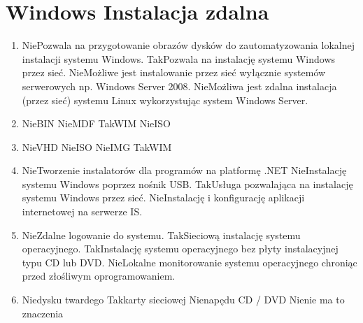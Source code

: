 
\newpage
\section{Windows Instalacja zdalna}
	\begin{enumerate}
		\item {}%
		{Nie}{Pozwala na przygotowanie obrazów dysków do zautomatyzowania lokalnej instalacji systemu Windows.}%
		{Tak}{Pozwala na instalację systemu Windows przez sieć.}%
		{Nie}{Możliwe jest instalowanie przez sieć wyłącznie systemów serwerowych np. Windows Server 2008.}%
		{Nie}{Możliwa jest zdalna instalacja (przez sieć) systemu Linux wykorzystując system Windows Server.}
		\item {}%
		{Nie}{BIN}%
		{Nie}{MDF}%
		{Tak}{WIM}%
		{Nie}{ISO}
		\item {}%
		{Nie}{VHD}%
		{Nie}{ISO}%
		{Nie}{IMG}%
		{Tak}{WIM}
		\item {}%
		{Nie}{Tworzenie instalatorów dla programów na platformę .NET}%
		{Nie}{Instalację systemu Windows poprzez nośnik USB.}%
		{Tak}{Usługa pozwalająca na instalację systemu Windows przez sieć.}%
		{Nie}{Instalację i konfigurację aplikacji internetowej na serwerze IS.}
		\item {}%
		{Nie}{Zdalne logowanie do systemu.}%
		{Tak}{Sieciową instalację systemu operacyjnego.}%
		{Tak}{Instalację systemu operacyjnego bez płyty instalacyjnej typu CD lub DVD.}%
		{Nie}{Lokalne monitorowanie systemu operacyjnego chroniąc przed złośliwym oprogramowaniem.}
		\item {}%
		{Nie}{dysku twardego}%
		{Tak}{karty sieciowej}%
		{Nie}{napędu CD / DVD}%
		{Nie}{nie ma to znaczenia}
		

\end{enumerate}
